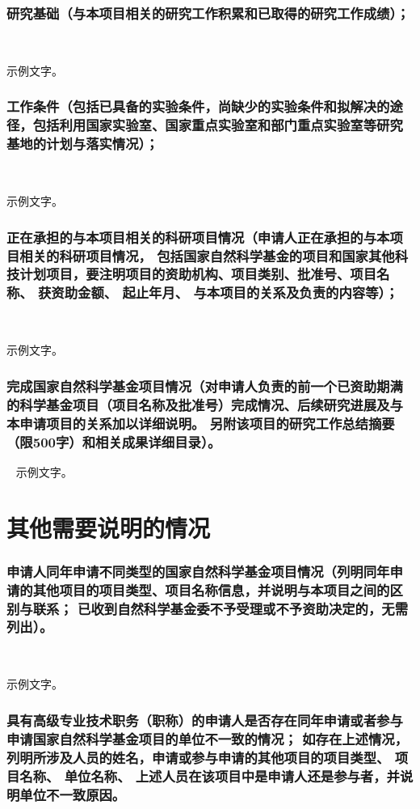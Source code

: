 \documentclass[12pt,a4paper]{article}
\begin{document}
\section{\textbf{研究基础}（与本项目相关的研究工作积累和已取得的研究工作成绩）；}\

示例文字。

\section{\textbf{工作条件}（包括已具备的实验条件，尚缺少的实验条件和拟解决的途径，包括利用国家实验室、国家重点实验室和部门重点实验室等研究基地的计划与落实情况）；}\

示例文字。

\section{\textbf{正在承担的与本项目相关的科研项目情况}（申请人正在承担的与本项目相关的科研项目情况，\hskip -8pt 包括国家自然科学基金的项目和国家其他科技计划项目，要注明项目的资助机构、项目类别、批准号、项目名称、\hskip -5pt 获资助金额、\hskip -5pt 起止年月、\hskip -5pt 与本项目的关系及负责的内容等）；}\

示例文字。

\section{\textbf{完成国家自然科学基金项目情况}（对申请人负责的前一个已资助期满的科学基金项目（项目名称及批准号）完成情况、后续研究进展及与本申请项目的关系加以详细说明。\hskip -8pt 另附该项目的研究工作总结摘要（限500字）和相关成果详细目录）。}\
示例文字。

\part{\textbf{其他需要说明的情况}}
\section{申请人同年申请不同类型的国家自然科学基金项目情况（列明同年申请的其他项目的项目类型、项目名称信息，并说明与本项目之间的区别与联系；\hskip -8pt 已收到自然科学基金委不予受理或不予资助决定的，无需列出）。}\

示例文字。

\section{具有高级专业技术职务（职称）的申请人是否存在同年申请或者参与申请国家自然科学基金项目的单位不一致的情况；\hskip -8pt 如存在上述情况，列明所涉及人员的姓名，申请或参与申请的其他项目的项目类型、\hskip -3pt 项目名称、\hskip -3pt 单位名称、\hskip -3pt 上述人员在该项目中是申请人还是参与者，并说明单位不一致原因。}\
\end{document}
